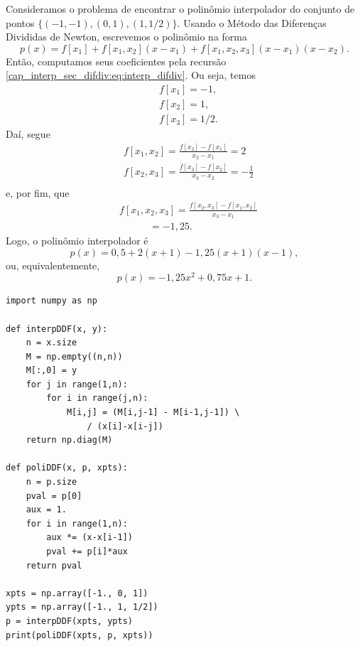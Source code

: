 \begin{ex}
  Consideramos o problema de encontrar o polinômio interpolador do conjunto de pontos $\{(-1, -1), (0, 1), (1, 1/2)\}$. Usando o Método das Diferenças Divididas de Newton, escrevemos o polinômio na forma
  \begin{equation}
    p(x) = f[x_1] + f[x_1,x_2](x-x_1) + f[x_1,x_2,x_3](x-x_1)(x-x_2).
  \end{equation}
  Então, computamos seus coeficientes pela recursão \eqref{cap_interp_sec_difdiv:eq:interp_difdiv}. Ou seja, temos
  \begin{subequations}
    \begin{align}
      &f[x_1] = -1,\\
      &f[x_2] = 1,\\
      &f[x_3] = 1/2.
  \end{align}
  \end{subequations}
  Daí, segue
  \begin{subequations}
    \begin{align}
      &f[x_1,x_2] = \frac{f[x_2]-f[x_1]}{x_2-x_1} = 2\\
      &f[x_2,x_3] = \frac{f[x_3]-f[x_2]}{x_3-x_2} = -\frac{1}{2}\\
    \end{align}
  \end{subequations}
  e, por fim, que
  \begin{subequations}
    \begin{align}
      &f[x_1,x_2,x_3] = \frac{f[x_2,x_3]-f[x_1,x_2]}{x_3-x_1}\\
      &\qquad\quad = -1,25.
    \end{align}
  \end{subequations}
  Logo, o polinômio interpolador é
  \begin{equation}
    p(x) = 0,5 + 2(x+1) - 1,25(x+1)(x-1),
  \end{equation}
  ou, equivalentemente,
  \begin{equation}
    p(x) = -1,25x^2 + 0,75x + 1.
  \end{equation}

\begin{lstlisting}
import numpy as np

def interpDDF(x, y):
    n = x.size
    M = np.empty((n,n))
    M[:,0] = y
    for j in range(1,n):
        for i in range(j,n):
            M[i,j] = (M[i,j-1] - M[i-1,j-1]) \
                / (x[i]-x[i-j])
    return np.diag(M)

def poliDDF(x, p, xpts):
    n = p.size
    pval = p[0]
    aux = 1.
    for i in range(1,n):
        aux *= (x-x[i-1])
        pval += p[i]*aux
    return pval

xpts = np.array([-1., 0, 1])
ypts = np.array([-1., 1, 1/2])
p = interpDDF(xpts, ypts)
print(poliDDF(xpts, p, xpts))
\end{lstlisting}
\end{ex}

